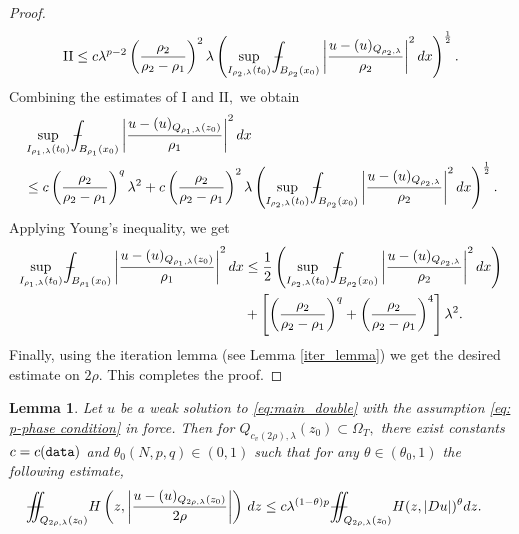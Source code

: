 \documentclass[notitlepage,11pt,reqno]{amsart}
\newtheorem{lemma}[theorem]{Lemma}
\theoremstyle{definition}
\numberwithin{equation}{section}
\newcommand{\iintss}{{\int\hspace{-0.28cm}\int}}
\newcommand{ \miints }{{\iintss\hspace{-0.56cm} -\hspace{-0.15cm}-}}
\newcommand{\miint}[1]{{\miints_{\hspace{-0.13cm}#1}}}
\def\Xint#1{\mathchoice
	{\XXint\displaystyle\textstyle{#1}}%
	{\XXint\textstyle\scriptstyle{#1}}%
	{\XXint\scriptstyle\scriptscriptstyle{#1}}%
	{\XXint\scriptscriptstyle\scriptscriptstyle{#1}}%
	\!\int}
\def\XXint#1#2#3{{\setbox0=\hbox{$#1{#2#3}{\int}$}
		\vcenter{\hbox{$#2#3$}}\kern-.50\wd0}}
\def\Xint#1{\mathchoice
	{\XXint\displaystyle\textstyle{#1}}%
	{\XXint\textstyle\scriptstyle{#1}}%
	{\XXint\scriptstyle\scriptscriptstyle{#1}}%
	{\XXint\scriptscriptstyle\scriptscriptstyle{#1}}%
	\!\int}
\def\XXint#1#2#3{{\setbox0=\hbox{$#1{#2#3}{\int}$}
		\vcenter{\hbox{$#2#3$}}\kern-.50\wd0}}
\def\dashint{\Xint-}
\begin{document}
\begin{proof}
\begin{align*}
    \mathrm{II} \leq c \lambda^{p-2}\left(\frac{\rho_2}{\rho_2-\rho_1}\right)^2 \lambda \left(\sup_{I_{\rho_2, \lambda}(t_0)}\dashint_{B_{\rho_2}(x_0)}\left|\frac{u-(u)_{Q_{\rho_2, \lambda}}}{\rho_2}\right|^2 dx\right)^{\frac{1}{2}}.
\end{align*}
Combining the estimates of $\mathrm{I}$ and $\mathrm{II}, $ we obtain
\begin{align*}
 &\sup_{I_{\rho_1, \lambda}(t_0)}\dashint_{B_{\rho_1}(x_0)}\left|\frac{u-(u)_{Q_{\rho_1, \lambda}(z_0)}}{\rho_1}\right|^2 dx\\ 
 &\leq c \left(\frac{\rho_2}{\rho_2-\rho_1}\right)^q \lambda^2
 +c \left(\frac{\rho_2}{\rho_2-\rho_1}\right)^2 \lambda \left(\sup_{I_{\rho_2, \lambda}(t_0)}\dashint_{B_{\rho_2}(x_0)}\left|\frac{u-(u)_{Q_{\rho_2, \lambda}}}{\rho_2}\right|^2 dx\right)^{\frac{1}{2}}.   
\end{align*}
Applying Young's inequality, we get
\begin{align*}
 \sup_{I_{\rho_1, \lambda}(t_0)}\dashint_{B_{\rho_1}(x_0)}\left|\frac{u-(u)_{Q_{\rho_1, \lambda}(z_0)}}{\rho_1}\right|^2 dx &\leq \frac{1}{2}\left(\sup_{I_{\rho_2, \lambda}(t_0)}\dashint_{B_{\rho_2}(x_0)}\left|\frac{u-(u)_{Q_{\rho_2, \lambda}}}{\rho_2}\right|^2 dx\right)\\
 &+ \left[\left(\frac{\rho_2}{\rho_2-\rho_1}\right)^q+\left(\frac{\rho_2}{\rho_2-\rho_1}\right)^4\right]\lambda^2.
\end{align*}
Finally, using the iteration lemma (see Lemma \ref{iter_lemma}) we get the desired estimate on $2\rho.$ This completes the proof.
\end{proof}
\begin{lemma}\label{LEM5.2}
  Let $u$ be a weak solution to \eqref{eq:main_double} with the assumption \ref{eq: p-phase condition} in force. Then for $Q_{c_v (2\rho), \lambda}(z_0)\subset \Omega_T,$ there exist constants $c=c(\textnormal{\texttt{data}})$ and $\theta_0 (N, p, q) \in (0, 1)$ such that for any $\theta \in (\theta_0, 1)$ the following estimate,  
  \begin{align*}
		\miint{Q_{2\rho, \lambda}(z_0)} H\left(z, \left|\frac{u-(u)_{Q_{2\rho, \lambda}(z_0)}}{2\rho}\right|\right)\,dz
		&\leq c\lambda^{(1-\theta)p} \miint{Q_{2\rho, \lambda}(z_0)}H(z, |D u|)^{\theta}dz.
	\end{align*}
\end{lemma}
\end{document}
